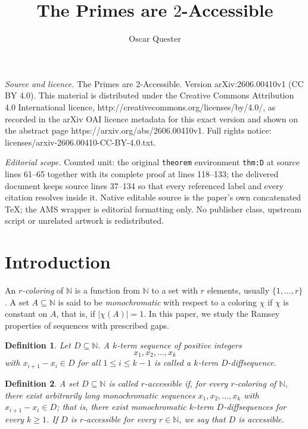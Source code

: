 \documentclass[10pt,a4paper]{amsart}
\newtheorem{definition}{Definition}
\newcommand{\N}{\mathbb{N}}
\begin{document}
\title[The Primes are 2-Accessible]{The Primes are $2$-Accessible}
\author{Oscar Quester}
\date{}
\maketitle
\noindent\emph{Source and licence.} The Primes are $2$-Accessible. Version arXiv:2606.00410v1 (CC BY 4.0). This material is distributed under the Creative Commons Attribution 4.0 International licence, http://creativecommons.org/licenses/by/4.0/, as recorded in the arXiv OAI licence metadata for this exact version and shown on the abstract page https://arxiv.org/abs/2606.00410v1. Full rights notice: licenses/arxiv-2606.00410-CC-BY-4.0.txt.\par\smallskip
\noindent\textit{Editorial scope.} Counted unit: the original \texttt{theorem} environment \texttt{thm:D} at source lines 61--65 together with its complete proof at lines 118--133; the delivered document keeps source lines 37--134 so that every referenced label and every citation resolves inside it. Native editable source is the paper's own concatenated TeX; the AMS wrapper is editorial formatting only. No publisher class, upstream script or unrelated artwork is redistributed.
\section{Introduction}

An \textit{$r$-coloring} of $\mathbb{N}$ is a function from $\mathbb{N}$ to a set with $r$ elements, usually $\{1,\dots,r\}$. A set $A \subseteq \mathbb{N}$ is said to be \textit{monochromatic} with respect to a coloring $\chi$ if $\chi$ is constant on $A$, that is, if $|\chi(A)|=1$. In this paper, we study the Ramsey properties of sequences with prescribed gaps.

\begin{definition}

Let $D \subseteq \N$. A $k$-term sequence of positive integers $$x_1,x_2,\dots,x_k$$ with $x_{i+1}-x_i \in D$ for all $1 \leq i \leq k-1$ is called a $k$-term \textit{$D$-diffsequence}.

\end{definition}

\begin{definition}
    
A set $D \subseteq \N$ is called \textit{$r$-accessible} if, for every $r$-coloring of $\N$, there exist arbitrarily long monochromatic sequences $x_1,x_2,\dots,x_k$ with $x_{i+1}-x_i \in D$; that is, there exist monochromatic $k$-term $D$-diffsequences for every $k \geq 1$. If $D$ is $r$-accessible for every $r \in \N$, we say that $D$ is \textit{accessible}.
    
\end{definition}
\end{document}

